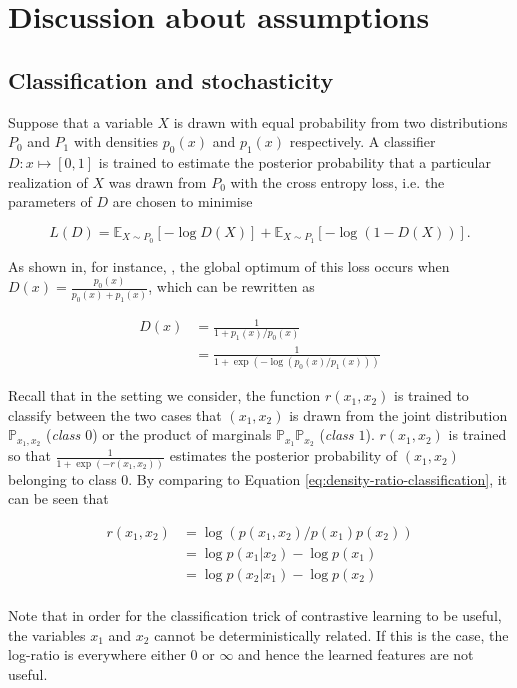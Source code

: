 \section{Discussion about assumptions}
\subsection{Classification and stochasticity}
\label{sec:converged}
Suppose that a variable $X$ is drawn with equal probability from two distributions $P_0$ and $P_1$ with densities $p_0(x)$ and $p_1(x)$ respectively.
A classifier $D: x \mapsto [0,1]$ is trained to estimate the posterior probability that a particular realization of $X$ was drawn from $P_0$ with the cross entropy loss, i.e. the parameters of $D$ are chosen to minimise

\[
L(D) = \mathbb{E}_{X\sim P_0} \left[ - \log D(X) \right] + \mathbb{E}_{X\sim P_1} \left[ - \log (1 - D(X)) \right].
\]

As shown in, for instance, \cite{goodfellow2014generative}, the global optimum of this loss occurs when $D(x) = \frac{p_0(x)}{p_0(x) + p_1(x)}$, which can be rewritten as

\begin{align}
D(x) &= \frac{1}{1 + p_1(x)/p_0(x)}\\
&= \frac{1}{1 + \exp ( - \log (p_0(x)/p_1(x))) } \label{eq:density-ratio-classification}
\end{align}

Recall that in the setting we consider, the function $r(x_1, x_2)$ is trained to classify between the two cases that $(x_1, x_2)$ is drawn from the joint distribution $\mathbb{P}_{x_1, x_2}$ (\emph{class $0$}) or the product of marginals $\mathbb{P}_{x_1}\mathbb{P}_{x_2}$ (\emph{class $1$}).
$r(x_1, x_2)$ is trained so that $\frac{1}{1 + \exp(-r(x_1, x_2))}$ estimates the posterior probability of $(x_1, x_2)$ belonging to class 0.
By comparing to Equation \ref{eq:density-ratio-classification}, it can be seen that

\begin{align*}
r(x_1, x_2) &= \log \left( p(x_1, x_2) / p(x_1) p(x_2)\right) \\
&= \log p(x_1 | x_2)  - \log p(x_1) \\
&= \log p(x_2 | x_1)  - \log p(x_2) \\
\end{align*}

Note that in order for the classification trick of contrastive learning to be useful, the variables $x_1$ and $x_2$ cannot be deterministically related.
If this is the case, the log-ratio is everywhere either $0$ or $\infty$ and hence the learned features are not useful.

